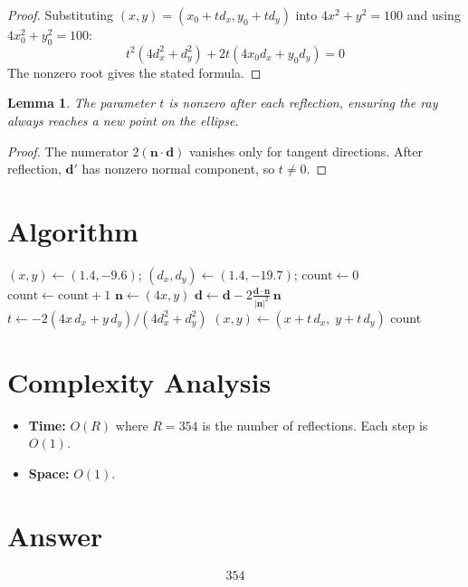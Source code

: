 \documentclass[12pt]{article}
\newtheorem{lemma}[theorem]{Lemma}
\begin{document}
\begin{proof}
Substituting $(x,y) = (x_0 + td_x, y_0 + td_y)$ into $4x^2 + y^2 = 100$ and using $4x_0^2 + y_0^2 = 100$:
\[
t^2(4d_x^2 + d_y^2) + 2t(4x_0 d_x + y_0 d_y) = 0
\]
The nonzero root gives the stated formula.
\end{proof}

\begin{lemma}
The parameter $t$ is nonzero after each reflection, ensuring the ray always reaches a new point on the ellipse.
\end{lemma}

\begin{proof}
The numerator $2(\mathbf{n} \cdot \mathbf{d})$ vanishes only for tangent directions. After reflection, $\mathbf{d}'$ has nonzero normal component, so $t \neq 0$.
\end{proof}

\section{Algorithm}

\begin{algorithmic}[1]
\State $(x, y) \gets (1.4, -9.6)$; $(d_x, d_y) \gets (1.4, -19.7)$; $\text{count} \gets 0$
\Repeat
    \State $\text{count} \gets \text{count} + 1$
    \State $\mathbf{n} \gets (4x, y)$
    \State $\mathbf{d} \gets \mathbf{d} - 2\frac{\mathbf{d} \cdot \mathbf{n}}{|\mathbf{n}|^2}\,\mathbf{n}$ 
    \State $t \gets -2(4x\,d_x + y\,d_y)/(4d_x^2 + d_y^2)$ 
    \State $(x, y) \gets (x + t\,d_x,\; y + t\,d_y)$
\State \Return count
\end{algorithmic}

\section{Complexity Analysis}

\begin{itemize}
\item \textbf{Time:} $O(R)$ where $R = 354$ is the number of reflections. Each step is $O(1)$.
\item \textbf{Space:} $O(1)$.
\end{itemize}

\section{Answer}

\[
\boxed{354}
\]
\end{document}
